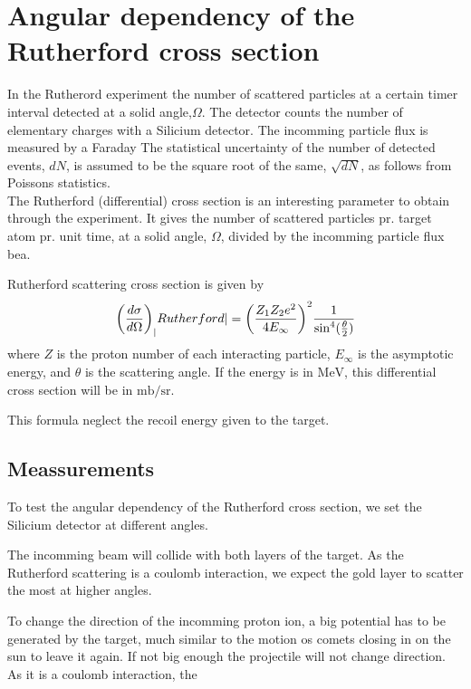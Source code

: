\section{Angular dependency of the Rutherford cross section}
In the Rutherord experiment the number of scattered particles at a certain timer interval detected at a solid angle,$\Omega$. The detector counts the number of elementary charges with a Silicium detector. The incomming particle flux is measured by a Faraday 
The statistical uncertainty of the number of detected events, $dN$, is assumed to be the square root of the same, $\sqrt{dN}$, as follows from Poissons statistics. \\



The Rutherford (differential) cross section is an interesting parameter to obtain through the experiment. It gives the number of scattered particles pr. target atom pr. unit time, at a solid angle, $\si{\Omega}$, divided by the incomming particle flux bea.


Rutherford scattering cross section \parencite[p. 16]{noteBB} is given by
\begin{align}
    {\left( \diff[d]{\sigma}{\Omega} \right)}_|Rutherford| =
    {\left(\frac{Z_1Z_2 e^2}{4E_{\infty}} \right)}^2
    \frac{1}{{{\sin}^4(\frac{\theta}{2})}}
\end{align}
where $Z$ is the proton number of each interacting particle, $E_{\infty}$ is
the asymptotic energy, and $\theta$ is the scattering angle. If the energy is
in $\si{\mega\electronvolt}$, this differential cross section will be in
$\si{\milli\barn\per\steradian}$.

This formula neglect the recoil energy given to the target.



\subsection{Meassurements}
To test the angular dependency of the Rutherford cross section, we set the
Silicium detector at different angles.

The incomming beam will collide with both layers of the target. As the
Rutherford scattering is a coulomb interaction, we expect the gold layer to
scatter the most at higher angles.

To change the direction of the incomming proton ion, a big potential has to be
generated by the target, much similar to the motion os comets closing in on the
sun to leave it again. If not big enough the projectile will not change
direction. As it is a coulomb interaction, the 

